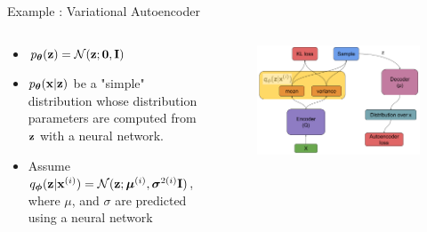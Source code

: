 \documentclass{beamer}
\begin{document}
\begin{frame}{Example : Variational Autoencoder}
    \begin{columns}[T]
        \begin{column}{.5\textwidth}
            \begin{itemize}
                \item {
                    $p_{\boldsymbol{\theta}}(\mathbf{z}) = \mathcal{N}(\mathbf{z}; \mathbf{0}, \mathbf{I})$
                }
                \item {
                    $p_{\boldsymbol{\theta}}(\mathbf{x}|\mathbf{z})$ be a "simple" distribution whose distribution parameters are computed from $\mathbf{z}$ with a neural network.
                }
                \item {
                    Assume $q_{\boldsymbol{\phi}}(\mathbf{z}|\mathbf{x}^{(i)}) = \mathcal{N}(\mathbf{z}; \boldsymbol{\mu}^{(i)}, \boldsymbol{\sigma}^{2 (i)} \mathbf{I})$, where $\mu$, and $\sigma$ are predicted using a neural network
                }
            \end{itemize}
        \end{column}
        \begin{column}{0.5\textwidth}
            \begin{figure}
                \centering
                \includegraphics[width=\textwidth]{vae_no_param}
            \end{figure}
        \end{column}
    \end{columns}
\end{frame}
\end{document}
